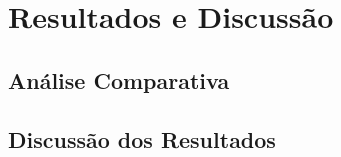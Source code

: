 \chapter{Resultados e Discuss\~ao}
\label{chap:resultados}

\section{An\'alise Comparativa}
\label{sec:resultados-analise}

\section{Discuss\~ao dos Resultados}
\label{sec:resultados-discussao}

